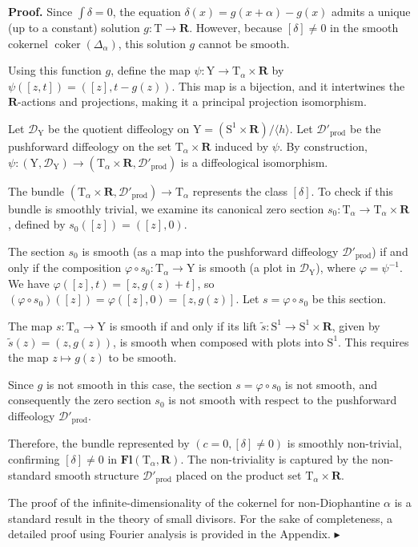 \documentclass[10pt,letterpaper,reqno]{amsart}
\theoremstyle{article}
\renewenvironment{proof}{\noindent \textbf{Proof.}} {\nolinebreak $\blacktriangleright$}
\newcommand{\1}{{\hat 1}}
\newcommand{\0}{{\hat 0}}
\newcommand{\RR}{\mathbf R}
\newcommand{\cD}{{\mathcal D}}
\def \S{\mathrm S}
\def \T{\mathrm T}
\def \Y{\mathrm Y}
\newcommand{\coker}{\operatorname{coker}}
\newcommand{\cl}[1]{\left[ #1 \right]}
\DeclareMathOperator{\Fb}{\boldsymbol{\mathsf{Fl}}}
\newcommand{\product}{\mathrm{prod}}
\renewcommand{\Fb}{\mathbf{Fl}}
\begin{document}
\begin{proof}
    Since $\int \delta = 0$,
    the equation $\delta(x) = g(x+\alpha) - g(x)$ admits a unique (up to a constant) solution $g: \T \to \RR$.
    However, because $\cl{\delta} \ne 0$ in the smooth cokernel $\coker(\Delta_\alpha)$,
    this solution $g$ cannot be smooth.
    
    Using this function $g$,
    define the map $\psi: \Y \to \T_\alpha \times \RR$ by $\psi(\cl{z,t}) = (\cl{z}, t - g(z))$.
    This map is a bijection,
    and it intertwines the $\RR$-actions and projections,
    making it a principal projection isomorphism.
    
    Let $\cD_\Y$ be the quotient diffeology on $\Y = (\S^1 \times \RR) / \langle h \rangle$.
    Let $\cD'_{\product}$ be the pushforward diffeology on the set $\T_\alpha \times \RR$ induced by $\psi$.
    By construction,
    $\psi: (\Y, \cD_\Y) \to (\T_\alpha \times \RR, \cD'_{\product})$ is a diffeological isomorphism.
    
    The bundle $(\T_\alpha \times \RR, \cD'_{\product}) \to \T_\alpha$ represents the class $\cl{\delta}$.
    To check if this bundle is smoothly trivial,
    we examine its canonical zero section $s_0: \T_\alpha \to \T_\alpha \times \RR$,
    defined by $s_0(\cl{z}) = (\cl{z}, 0)$.
    
    The section $s_0$ is smooth (as a map into the pushforward diffeology $\cD'_{\product}$) if and only if the composition $\varphi \circ s_0: \T_\alpha \to \Y$ is smooth (a plot in $\cD_\Y$),
    where $\varphi = \psi^{-1}$.
    We have $\varphi(\cl{z}, t) = \cl{z, g(z)+t}$,
    so $(\varphi \circ s_0)(\cl{z}) = \varphi(\cl{z}, 0) = \cl{z, g(z)}$.
    Let $s = \varphi \circ s_0$ be this section.
    
    The map $s: \T_\alpha \to \Y$ is smooth if and only if its lift $\tilde{s}: \S^1 \to \S^1 \times \RR$,
    given by $\tilde{s}(z) = (z, g(z))$,
    is smooth when composed with plots into $\S^1$.
    This requires the map $z \mapsto g(z)$ to be smooth.
    
    Since $g$ is not smooth in this case,
    the section $s = \varphi \circ s_0$ is not smooth,
    and consequently the zero section $s_0$ is not smooth with respect to the pushforward diffeology $\cD'_{\product}$.
    
    Therefore,
    the bundle represented by $(c=0, \cl{\delta}\ne 0)$ is smoothly non-trivial,
    confirming $\cl{\delta} \ne 0$ in $\Fb(\T_\alpha, \RR)$.
    The non-triviality is captured by the non-standard smooth structure $\cD'_{\product}$ placed on the product set $\T_\alpha \times \RR$.
    
    The proof of the infinite-dimensionality of the cokernel for non-Diophantine $\alpha$ is a standard result in the theory of small divisors.
    For the sake of completeness,
    a detailed proof using Fourier analysis is provided in the Appendix.
  \end{proof}
    
\end{document}

